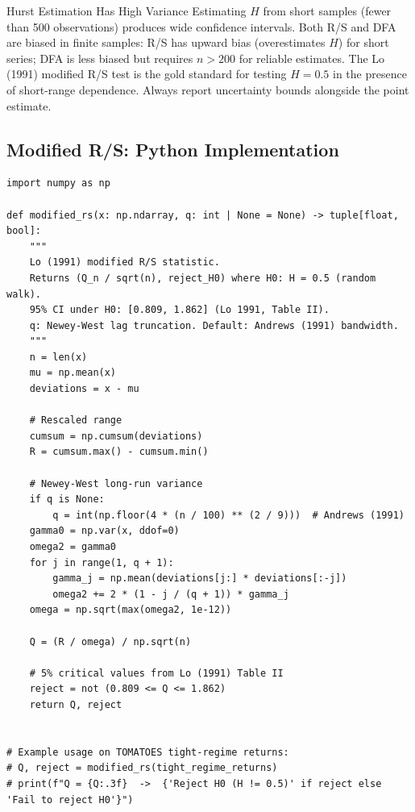 \documentclass[12pt,a4paper,openany]{report}
\theoremstyle{definition}
\begin{document}
\begin{warningbox}{Hurst Estimation Has High Variance}
Estimating $H$ from short samples (fewer than 500 observations) produces wide confidence intervals. Both R/S and DFA are biased in finite samples: R/S has upward bias (overestimates $H$) for short series; DFA is less biased but requires $n > 200$ for reliable estimates. The Lo (1991) modified R/S test is the gold standard for testing $H = 0.5$ in the presence of short-range dependence. Always report uncertainty bounds alongside the point estimate.
\end{warningbox}

\subsection{Modified R/S: Python Implementation}

\begin{lstlisting}[caption={Lo (1991) modified R/S test with Newey-West long-run variance}]
import numpy as np

def modified_rs(x: np.ndarray, q: int | None = None) -> tuple[float, bool]:
    """
    Lo (1991) modified R/S statistic.
    Returns (Q_n / sqrt(n), reject_H0) where H0: H = 0.5 (random walk).
    95% CI under H0: [0.809, 1.862] (Lo 1991, Table II).
    q: Newey-West lag truncation. Default: Andrews (1991) bandwidth.
    """
    n = len(x)
    mu = np.mean(x)
    deviations = x - mu

    # Rescaled range
    cumsum = np.cumsum(deviations)
    R = cumsum.max() - cumsum.min()

    # Newey-West long-run variance
    if q is None:
        q = int(np.floor(4 * (n / 100) ** (2 / 9)))  # Andrews (1991)
    gamma0 = np.var(x, ddof=0)
    omega2 = gamma0
    for j in range(1, q + 1):
        gamma_j = np.mean(deviations[j:] * deviations[:-j])
        omega2 += 2 * (1 - j / (q + 1)) * gamma_j
    omega = np.sqrt(max(omega2, 1e-12))

    Q = (R / omega) / np.sqrt(n)

    # 5% critical values from Lo (1991) Table II
    reject = not (0.809 <= Q <= 1.862)
    return Q, reject


# Example usage on TOMATOES tight-regime returns:
# Q, reject = modified_rs(tight_regime_returns)
# print(f"Q = {Q:.3f}  ->  {'Reject H0 (H != 0.5)' if reject else 'Fail to reject H0'}")
\end{lstlisting}
\end{document}
